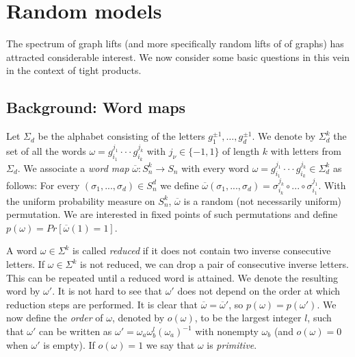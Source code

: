 \documentclass[12pt]{article}
\newtheorem{open question}[theorem]{Open question}
\begin{document}
\section{Random models}\label{se:random models}

The spectrum of graph lifts (and more specifically random lifts of
of graphs) has attracted considerable interest. We now consider some basic questions in this vein
in the context of tight products.

\subsection{Background: Word maps}\label{Background:-Word-maps}
Let $\Sigma_d$ be the alphabet consisting of the letters $g_1^{\pm 1},\ldots,g_d^{\pm 1}$. We denote by $\Sigma_d^k$ the set of all the words $\omega=g_{i_1}^{j_1}\cdot\cdot\cdot g_{i_{k}}^{j_{k}}$ with $j_{\nu} \in \{-1,1\}$
of length $k$ with letters from $\Sigma_d$. We associate a {\em word map} $\overline{\omega} : S_n^k\rightarrow S_n$
with every word $\omega=g_{i_1}^{j_1}\cdot\cdot\cdot g_{i_{k}}^{j_{k}} \in \Sigma_d^k$ as follows:
For every $(\sigma_1,...,\sigma_d) \in S_n^d$ we define $\overline{\omega} (\sigma_1,...,\sigma_d)=\sigma_{i_k}^{j_k}\circ...\circ \sigma_{i_1}^{j_1}$. With the uniform probability measure on $S_n^k$, $\overline{\omega}$ is a random (not necessarily uniform) permutation. We are interested in fixed points of such permutations and define $p(\omega)=Pr[\overline{\omega}(1)=1]$.

A word $\omega \in \Sigma^k$ is
called {\em reduced} if it does not contain two inverse consecutive letters. If $\omega \in \Sigma^k$ is not reduced, we can drop a pair of consecutive inverse letters. This can be repeated until a reduced word is attained.  We denote the resulting word by $\omega'$. It is not hard to see that $\omega '$ does not depend on the order at which reduction steps are performed. It is clear that $\overline{\omega}=\overline{\omega}'$, so $p(\omega)=p(\omega')$. We now define the {\em order} of $\omega$, denoted by $o(\omega)$, to be the largest integer $l$, such that $\omega'$ can be written as $\omega'=\omega_a \omega_b^l (\omega_a)^{-1}$ with nonempty $\omega_b$ (and $o(\omega)=0$ when $\omega'$ is empty). If $o(\omega)=1$ we say that $\omega$ is {\em primitive}.
\end{document}
